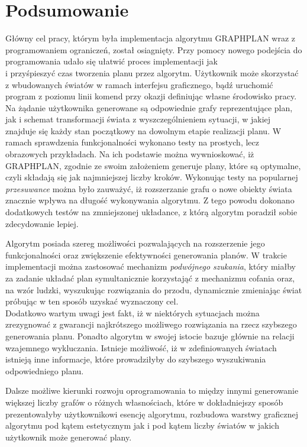 \chapter*{Podsumowanie}
\thispagestyle{chapterBeginStyle}

    Główny cel pracy, którym była implementacja algorytmu GRAPHPLAN wraz z programowaniem ograniczeń, został osiagnięty. Przy pomocy 
    nowego podejścia do programowania udało się ułatwić proces implementacji jak \\
    i przyśpieszyć czas tworzenia planu przez algorytm. Użytkownik 
    może skorzystać z wbudowanych światów w ramach interfejsu graficznego, bądź uruchomić program z poziomu linii komend przy okazji 
    definiując własne środowisko pracy. Na żądanie użytkownika generowane są odpowiednie grafy reprezentujące plan, jak i schemat 
    transformacji świata z wyszczególnieniem sytuacji, w jakiej znajduje się każdy stan początkowy na dowolnym etapie realizacji planu.
    W ramach sprawdzenia funkcjonalności wykonano testy na prostych, lecz obrazowych przykładach. Na ich podstawie można wywnioskować, iż GRAPHPLAN,
    zgodnie ze swoim założeniem generuje plany, które są optymalne, czyli składają się jak najmniejszej liczby kroków. Wykonując testy na 
    popularnej \textit{przesuwance} można było zauważyć, iż rozszerzanie grafu o nowe obiekty świata znacznie wpływa na długość wykonywania algorytmu. 
    Z tego powodu dokonano dodatkowych testów na zmniejszonej układance, z którą algorytm poradził sobie zdecydowanie lepiej. 

    Algorytm posiada szereg możliwości pozwalających na rozszerzenie jego funkcjonalności oraz zwiększenie efektywności generowania planów. W trakcie 
    implementacji można zastosować mechanizm \textit{podwójnego szukania}, który miałby za zadanie układać plan symultanicznie korzystająć z mechanizmu 
    cofania oraz, na wzór ludzki, wyszukując rozwiązania do przodu, dynamicznie zmieniając świat próbując w ten sposób uzyskać wyznaczony cel. \\
    Dodatkowo wartym uwagi jest fakt, iż
    w niektórych sytuacjach można zrezygnować z gwarancji najkrótszego możliwego rozwiązania na rzecz szybszego generowania planu. Ponadto 
    algorytm w swojej istocie bazuje głównie na relacji wzajemnego wykluczania. Istnieje możliwość, iż w zdefiniowanych światach istnieją inne informacje,
    które prowadziłyby do szybszego wyszukiwania odpowiedniego planu.

    Dalsze możliwe kierunki rozwoju oprogramowania to między innymi generowanie większej liczby grafów o różnych własnościach, które
    w dokładniejszy sposób prezentowałyby użytkownikowi esencję algorytmu, rozbudowa warstwy graficznej algorytmu pod kątem estetycznym jak i 
    pod kątem liczby światów w jakich użytkownik może generować plany.

